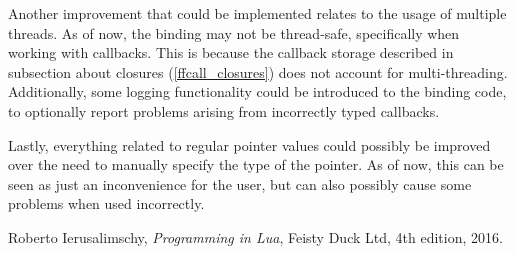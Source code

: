 \documentclass[polish, english]{iithesis}
\begin{document}
    Another improvement that could be implemented relates to the usage of multiple threads.
    As of now, the binding may not be thread-safe, specifically when working with callbacks.
    This is because the callback storage described in subsection about closures (\ref{ffcall_closures}) does not account for multi-threading.
    Additionally, some logging functionality could be introduced to the binding code, to optionally report problems arising from incorrectly typed callbacks.

    Lastly, everything related to regular pointer values could possibly be improved over the need to manually specify the type of the pointer.
    As of now, this can be seen as just an inconvenience for the user, but can also possibly cause some problems when used incorrectly.

\begin{thebibliography}{42}
    Roberto Ierusalimschy,
    \emph{Programming in Lua},
    Feisty Duck Ltd,
    4th edition,
    2016.
\end{thebibliography}
\end{document}
